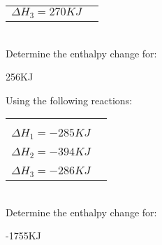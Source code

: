 \documentclass[main.tex]{subfiles}
\begin{document}
\begin{multicols*}{2}
\begin{question}[ID=\the\value{numA}]
\begin{tabularx}{\columnwidth}{>{}m{.65\linewidth} *{2}{Y} }
    \\
\end{tabularx}\\
Determine the enthalpy change for:
\begin{center}\end{center}\end{question}
\begin{solution}
256KJ
 \hspace{0.1cm}\end{solution}
\begin{question}[ID=\the\value{numA}]
Using the following reactions:\\
\begin{tabularx}{\columnwidth}{>{}m{.65\linewidth} *{2}{Y} }
   \\
   \\
    \\
   \\
    \\
   \\
    \\
\end{tabularx}\\
Determine the enthalpy change for:
\begin{center}\end{center}\end{question}

\begin{solution}
-1755KJ
 \hspace{0.1cm}\end{solution}


\end{multicols*}
\end{document}
